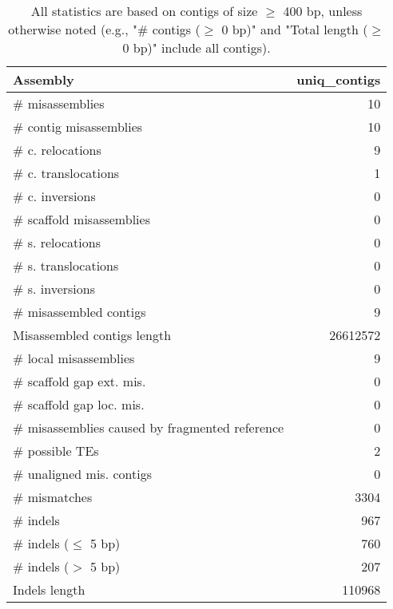 \documentclass[12pt,a4paper]{article}
\begin{document}
\begin{table}[ht]
\begin{center}
\caption{All statistics are based on contigs of size $\geq$ 400 bp, unless otherwise noted (e.g., "\# contigs ($\geq$ 0 bp)" and "Total length ($\geq$ 0 bp)" include all contigs).}
\begin{tabular}{|l*{1}{|r}|}
\hline
Assembly & uniq\_contigs \\ \hline
\# misassemblies & 10 \\ \hline
\hspace{2mm}\# contig misassemblies & 10 \\ \hline
\hspace{5mm}\# c. relocations & 9 \\ \hline
\hspace{5mm}\# c. translocations & 1 \\ \hline
\hspace{5mm}\# c. inversions & 0 \\ \hline
\hspace{2mm}\# scaffold misassemblies & 0 \\ \hline
\hspace{5mm}\# s. relocations & 0 \\ \hline
\hspace{5mm}\# s. translocations & 0 \\ \hline
\hspace{5mm}\# s. inversions & 0 \\ \hline
\# misassembled contigs & 9 \\ \hline
Misassembled contigs length & 26612572 \\ \hline
\# local misassemblies & 9 \\ \hline
\# scaffold gap ext. mis. & 0 \\ \hline
\# scaffold gap loc. mis. & 0 \\ \hline
\# misassemblies caused by fragmented reference & 0 \\ \hline
\# possible TEs & 2 \\ \hline
\# unaligned mis. contigs & 0 \\ \hline
\# mismatches & 3304 \\ \hline
\# indels & 967 \\ \hline
\hspace{5mm}\# indels ($\leq$ 5 bp) & 760 \\ \hline
\hspace{5mm}\# indels ($>$ 5 bp) & 207 \\ \hline
Indels length & 110968 \\ \hline
\end{tabular}
\end{center}
\end{table}
\end{document}

